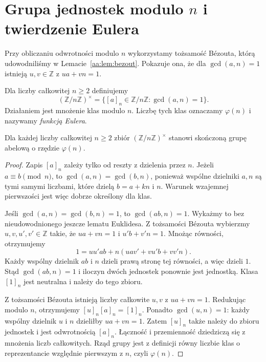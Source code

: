 \section{Grupa jednostek modulo \texorpdfstring{$n$}{n} i twierdzenie Eulera}
Przy obliczaniu odwrotności modulo $n$ wykorzystamy tożsamość
Bézouta, którą udowodniliśmy w Lemacie~\ref{aa:lem:bezout}.
Pokazuje ona, że dla $\gcd(a,n)=1$ istnieją
$u,v\in\mathbb Z$ z $ua+vn=1$.


\begin{definicja}
\label{aa:def:jednostki}
Dla liczby całkowitej $n\ge2$ definiujemy
\[
 (\mathbb Z/n\mathbb Z)^\times
 =\{[a]_n\in\mathbb Z/n\mathbb Z:\gcd(a,n)=1\}.
\]
Działaniem jest mnożenie klas modulo $n$. Liczbę tych klas
oznaczamy $\varphi(n)$ i nazywamy \emph{funkcją Eulera}.
\end{definicja}

\begin{lemat}
\label{aa:lem:jednostki-grupa}
Dla każdej liczby całkowitej $n\ge2$ zbiór $(\mathbb Z/n\mathbb Z)^\times$
stanowi skończoną grupę abelową o rzędzie $\varphi(n)$.
\end{lemat}
\begin{proof}
Zapis $[a]_n$ zależy tylko od reszty z dzielenia przez $n$.
Jeżeli $a\equiv b\pmod n$, to $\gcd(a,n)=\gcd(b,n)$,
ponieważ wspólne dzielniki $a,n$ są tymi samymi liczbami,
które dzielą $b=a+kn$ i $n$.
Warunek wzajemnej pierwszości jest więc dobrze określony dla klas.

Jeśli $\gcd(a,n)=\gcd(b,n)=1$, to $\gcd(ab,n)=1$.
Wykażmy to bez nieudowodnionego jeszcze lematu Euklidesa.
Z tożsamości Bézouta wybierzmy $u,v,u',v'\in\mathbb Z$ takie,
że $ua+vn=1$ i $u'b+v'n=1$. Mnożąc równości,
otrzymujemy
\[
1=uu'ab+n(uav'+vu'b+vv'n).
\]
Każdy wspólny dzielnik $ab$ i $n$ dzieli prawą stronę
tej równości, a więc dzieli $1$. Stąd $\gcd(ab,n)=1$
i iloczyn dwóch jednostek ponownie jest jednostką.
Klasa $[1]_n$ jest neutralna i należy do tego zbioru.

Z tożsamości Bézouta istnieją liczby całkowite $u,v$ z
$ua+vn=1$. Redukując modulo $n$, otrzymujemy
$[u]_n[a]_n=[1]_n$. Ponadto $\gcd(u,n)=1$:
każdy wspólny dzielnik $u$ i $n$ dzieliłby $ua+vn=1$.
Zatem $[u]_n$ także należy do zbioru jednostek i jest
odwrotnością $[a]_n$. Łączność i przemienność dziedziczą się
z mnożenia liczb całkowitych. Rząd grupy jest z definicji równy
liczbie klas o reprezentancie względnie pierwszym z $n$,
czyli $\varphi(n)$.
\end{proof}

